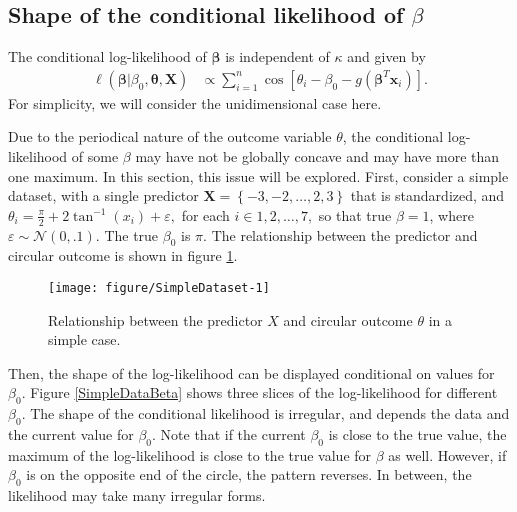 \documentclass[12pt,a4paper]{article}\usepackage[]{graphicx}\usepackage[]{color}
\makeatletter
\def\maxwidth{ %
  \ifdim\Gin@nat@width>\linewidth
    \linewidth
  \else
    \Gin@nat@width
  \fi
}
\newenvironment{knitrout}{}{} %
\makeatother
\begin{document}
\subsection{Shape of the conditional likelihood of $\beta$}



The conditional log-likelihood of $\boldsymbol{\beta}$ is independent of $\kappa$ and given by
\begin{align}
\ell (\boldsymbol{\beta} \vert \beta_0, \boldsymbol{\theta}, \boldsymbol{X}) &\propto
\sum_{i=1}^{n} \cos \left[ \theta_i - \beta_0 - g(\boldsymbol\beta^T \boldsymbol{x}_i) \right]  .
\end{align}
For simplicity, we will consider the unidimensional case here.

Due to the periodical nature of the outcome variable $\theta$, the conditional log-likelihood of some $\beta$ may have not be globally concave and may have more than one maximum. In this section, this issue will be explored. First, consider a simple dataset, with a single predictor $\boldsymbol{X} = \left\lbrace -3, -2, \dots, 2, 3 \right\rbrace $ that is standardized, and $\theta_i = \frac{\pi}{2} + 2 \tan^{-1} (x_i) + \varepsilon,$ for each $ i \in 1, 2, \dots, 7,$ so that true $\beta = 1$, where $\varepsilon \sim \mathcal{N}(0, .1)$. The true $\beta_0$ is $\pi$. The relationship between the predictor and circular outcome is shown in figure \ref{SimpleDataset}.


\begin{figure}
\label{SimpleDataset}
\begin{knitrout}
\color{fgcolor}

{\centering \texttt{[image: figure/SimpleDataset-1]} 

}



\end{knitrout}
\caption{Relationship between the predictor $X$ and circular outcome $\theta$ in a simple case.}
\label{SimpleDataset}
\end{figure}

Then, the shape of the log-likelihood can be displayed conditional on values for $\beta_0$. Figure \ref{SimpleDataBeta} shows three slices of the log-likelihood for different $\beta_0$. The shape of the conditional likelihood is irregular, and depends the data and the current value for $\beta_0$. Note that if the current $\beta_0$ is close to the true value, the maximum of the log-likelihood is close to the true value for $\beta$ as well. However, if $\beta_0$ is on the opposite end of the circle, the pattern reverses. In between, the likelihood may take many irregular forms.
\end{document}
